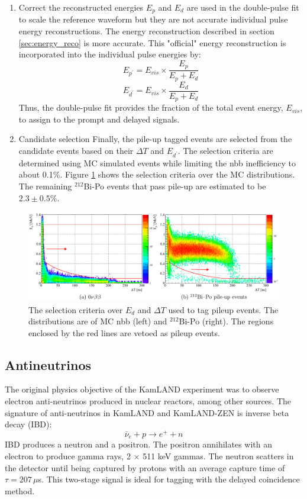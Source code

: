 \begin{enumerate}
	\item Correct the reconstructed energies
	$E_p$ and $E_d$ are used in the double-pulse fit to scale the reference waveform but they are not accurate individual pulse energy reconstructions. The energy reconstruction described in section \ref{sec:energy_reco} is more accurate. This "official" energy reconstruction is incorporated into the individual pulse energies by:
	\begin{equation}
		E_{p^\prime}=E_{vis}\times\frac{E_p}{E_p+E_d}
	\end{equation}
	\begin{equation}
		E_{d^\prime}=E_{vis}\times\frac{E_d}{E_p+E_d}
	\end{equation}
	Thus, the double-pulse fit provides the fraction of the total event energy, $E_{vis}$, to assign to the prompt and delayed signals.
	\item Candidate selection
	Finally, the pile-up tagged events are selected from the candidate events based on their $\Delta T$ and $E_{d^\prime}$. The selection criteria are determined using MC simulated events while limiting the \0nbb inefficiency to about 0.1\%. Figure \ref{fig:pileup_selection} shows the selection criteria over the MC distributions. The remaining $^{212}$Bi-Po events that pass pile-up are estimated to be $2.3\pm0.5\%$.
\end{enumerate}
\begin{figure}[htb]
	\centering
	\includegraphics[scale=0.35]{dp_selection.png}
	\caption{The selection criteria over $E_d$ and $\Delta T$ used to tag pileup events. The distributions are of MC \0nbb (left) and $^{212}$Bi-Po (right). The regions enclosed by the red lines are vetoed as pileup events.}
	\label{fig:pileup_selection}
\end{figure}

\subsection{Antineutrinos}
The original physics objective of the KamLAND experiment was to observe electron anti-neutrinos produced in nuclear reactors, among other sources. The signature of anti-neutrinos in KamLAND and KamLAND-ZEN is inverse beta decay (IBD):
\begin{equation}
	\bar{\nu}_e+p\rightarrow e^+ + n
\end{equation}
IBD produces a neutron and a positron. The positron annihilates with an electron to produce gamma rays, 2 $\times$ 511 keV gammas. The neutron scatters in the detector until being captured by protons with an average capture time of $\tau=207\,\mu$s. This two-stage signal is ideal for tagging with the delayed coincidence method.

